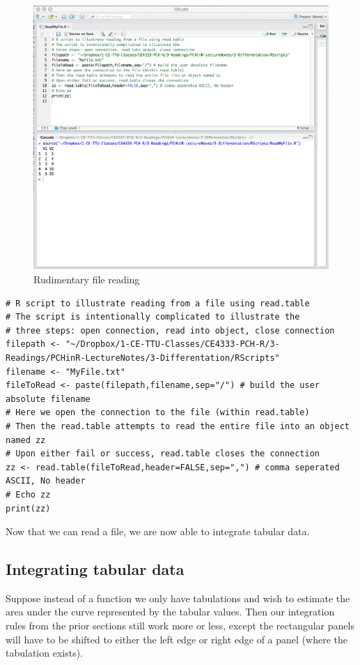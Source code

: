 \begin{figure}[h!] %
   \centering
   \includegraphics[width=6in]{./3-Differentation/ReadMyFile.jpg} 
   \caption{Rudimentary file reading}
   \label{fig:ReadMyFile}
\end{figure}

\begin{lstlisting}[caption=R code demonstrating Reading from a File, label=lst:ReadMyFile]
# R script to illustrate reading from a file using read.table
# The script is intentionally complicated to illustrate the 
# three steps: open connection, read into object, close connection
filepath <- "~/Dropbox/1-CE-TTU-Classes/CE4333-PCH-R/3-Readings/PCHinR-LectureNotes/3-Differentation/RScripts"
filename <- "MyFile.txt"
fileToRead <- paste(filepath,filename,sep="/") # build the user absolute filename
# Here we open the connection to the file (within read.table)
# Then the read.table attempts to read the entire file into an object named zz
# Upon either fail or success, read.table closes the connection
zz <- read.table(fileToRead,header=FALSE,sep=",") # comma seperated ASCII, No header
# Echo zz 
print(zz)
\end{lstlisting}

Now that we can read a file,  we are now able to integrate tabular data.

\subsection{Integrating tabular data}
Suppose instead of a function we only have tabulations and wish to estimate the area under the curve represented by the tabular values.  Then our integration rules from the prior sections still work more or less, except the rectangular panels will have to be shifted to either the left edge or right edge of a panel (where the tabulation exists).   

